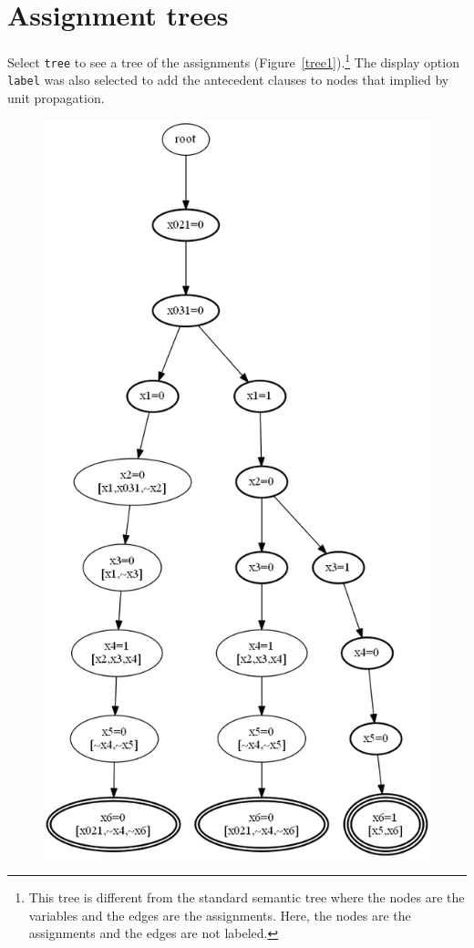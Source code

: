 \documentclass[11pt]{report}
\newcommand*{\p}[1]{\textup{\texttt{#1}}}
\begin{document}
\begin{itemize}
\end{itemize}

\newpage

\section{Assignment trees}

Select \p{tree} to see a tree of the assignments
(Figure~\ref{tree1}).\footnote{This tree is different from the standard
semantic tree where the nodes are the variables and the edges are the
assignments. Here, the nodes are the assignments and the edges are not
labeled.} The display option \p{label} was also selected to add the
antecedent clauses to nodes that implied by unit propagation.

\begin{figure}
\begin{center}
\includegraphics[keepaspectratio=true,height=.9\textheight]{tree1-bw}

\end{center}
\end{figure}
\end{document}
